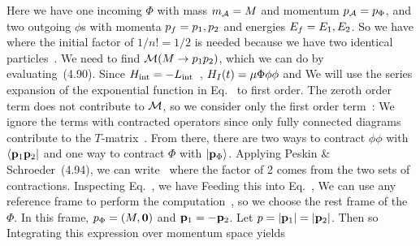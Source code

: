 {	Here we have one incoming $\Phi$ with mass $m_{\mathcal{A}} = M$ and momentum $p_{\mathcal{A}} = p_\Phi$, and two outgoing $\phi$s with  momenta $p_f = p_1, p_2$ and energies $E_f = E_1, E_2$.  So we have
	where the initial factor of $1/n! = 1/2$ is needed because we have two identical particles~\cite[p.~108]{Peskin}.  We need to find $\mathcal{M}(M \to p_1 p_2)$, which we can do by evaluating~(4.90).  Since $H_\text{int} = -L_\text{int}$~\cite[p.~77]{Peskin}, $H_I(t) = \mu \Phi \phi \phi$ and
	We will use the series expansion of the exponential function in Eq.~ to first order.  The zeroth order term does not contribute to $\mathcal{M}$, so we consider only the first order term~\cite[p.~110]{Peskin}:
	We ignore the terms with contracted operators since only fully connected diagrams contribute to the $T$-matrix~\cite[p.~111]{Peskin}.  From there, there are two ways to contract $\phi \phi$ with $\bra{\vb{p}_1 \vb{p}_2}$ and one way to contract $\Phi$ with $\ket{\vb{p}_\Phi}$.  Applying Peskin \& Schroeder~(4.94),
	we can write~\cite[p.~112]{Peskin}
	where the factor of 2 comes from the two sets of contractions.  Inspecting Eq.~, we have
	Feeding this into Eq.~,
	We can use any reference frame to perform the computation~\cite[p.~100]{Peskin}, so we choose the rest frame of the $\Phi$.  In this frame, $p_\Phi = (M, \mathbf{0})$ and $\vb{p}_1 = -\vb{p}_2$.  Let $p = \abs{\vb{p}_1} = \abs{\vb{p}_2}$.  Then
	so
	Integrating this expression over momentum space yields
	}
